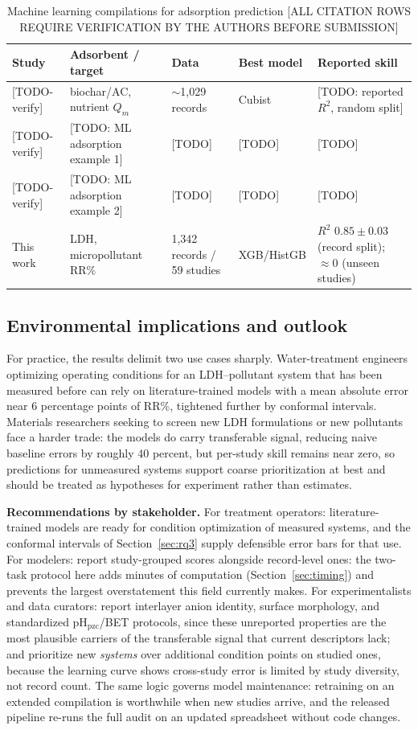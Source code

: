 \begin{table}[t]
\centering
\small
\caption{Machine learning compilations for adsorption prediction
[ALL CITATION ROWS REQUIRE VERIFICATION BY THE AUTHORS BEFORE
SUBMISSION]}
\label{tab:prior}
\begin{tabular}{lllll}
\toprule
Study & Adsorbent / target & Data & Best model & Reported skill \\
\midrule
{[TODO-verify]} & biochar/AC, nutrient $Q_m$ & $\sim$1{,}029 records & Cubist &
  [TODO: reported $R^2$, random split] \\
{[TODO-verify]} & [TODO: ML adsorption example 1] & [TODO] & [TODO] & [TODO] \\
{[TODO-verify]} & [TODO: ML adsorption example 2] & [TODO] & [TODO] & [TODO] \\
\midrule
This work & LDH, micropollutant RR\% & 1{,}342 records / 59 studies & XGB/HistGB &
  $R^2$ $0.85 \pm 0.03$ (record split); $\approx 0$ (unseen studies) \\
\bottomrule
\end{tabular}
\end{table}

\subsection{Environmental implications and outlook}
\label{sec:implications}

For practice, the results delimit two use cases sharply. Water-treatment
engineers optimizing operating conditions for an LDH--pollutant system
that has been measured before can rely on literature-trained models with
a mean absolute error near 6 percentage points of RR\%, tightened
further by conformal intervals. Materials researchers seeking to screen
new LDH formulations or new pollutants face a harder trade: the models
do carry transferable signal, reducing naive baseline errors by roughly
40 percent, but per-study skill remains near zero, so predictions for
unmeasured systems support coarse prioritization at best and should be
treated as hypotheses for experiment rather than estimates.

\textbf{Recommendations by stakeholder.} For treatment operators:
literature-trained models are ready for condition optimization of
measured systems, and the conformal intervals of
Section~\ref{sec:rq3} supply defensible error bars for that use. For
modelers: report study-grouped scores alongside record-level ones:
the two-task protocol here adds minutes of computation
(Section~\ref{sec:timing}) and prevents the largest overstatement this
field currently makes. For experimentalists and data curators: report
interlayer anion identity, surface morphology, and standardized
pH$_{\mathrm{pzc}}$/BET protocols, since these unreported properties are
the most plausible carriers of the transferable signal that current
descriptors lack; and prioritize new \emph{systems} over additional
condition points on studied ones, because the learning curve shows
cross-study error is limited by study diversity, not record count. The
same logic governs model maintenance: retraining on an extended
compilation is worthwhile when new studies arrive, and the released
pipeline re-runs the full audit on an updated spreadsheet without code
changes.

